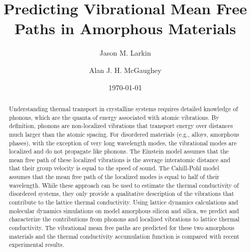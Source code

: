 \documentclass[aps,prb,twocolumn,superscriptaddress,footinbib,amsmath,amssymb,floatfix]{revtex4}
\begin{document}
\title{Predicting Vibrational Mean Free Paths in Amorphous Materials}
\author{Jason M. Larkin}
\author{Alan J. H. McGaughey}
\date{\today}
\begin{abstract}
Understanding thermal transport in crystalline systems requires detailed 
knowledge of phonons, which are the quanta of energy associated with atomic 
vibrations. By definition, phonons are non-localized vibrations that 
transport energy over distances much larger than the atomic spacing. For 
disordered materials (e.g., alloys, amorphous phases), with the exception 
of very long wavelength modes, the vibrational modes are localized and do 
not propagate like phonons. The Einstein model assumes that the mean free 
path of these localized vibrations is the average interatomic distance and 
that their group velocity is equal to the speed of sound. The Cahill-Pohl 
model assumes that the mean free path of the localized modes is equal to 
half of their wavelength. While these approach can be used to estimate the 
thermal conductivity of disordered systems, they only 
provide a qualitative description of the vibrations that contribute to the 
lattice thermal conductivity.
Using lattice dynamics calculations and molecular dynamics simulations on 
model amorphous silicon and silica, we predict and 
characterize the contributions from phonons and localized vibrations to 
lattice thermal conductivity. The vibrational mean free paths are 
predicted for these two amorphous materials and the thermal 
conductivity accumulation function is compared with recent experimental 
results.

\end{abstract}
\maketitle
\clearpage
\end{document}
